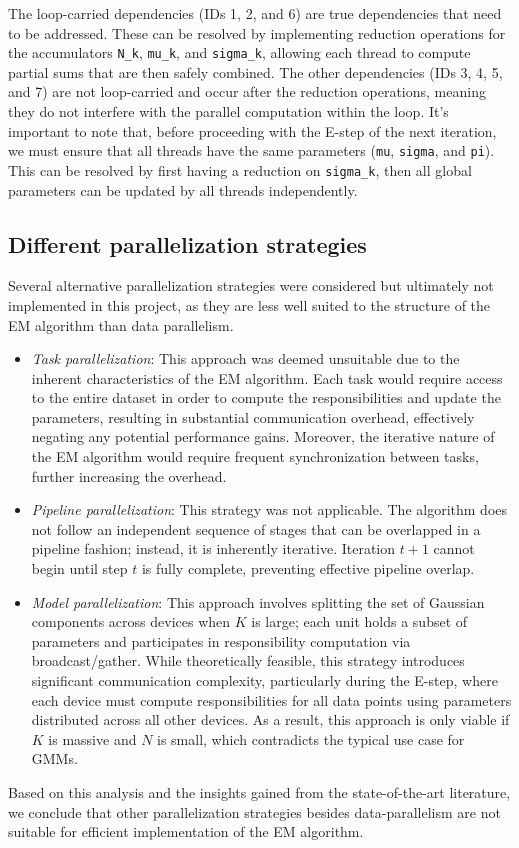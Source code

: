 The loop-carried dependencies (IDs 1, 2, and 6) are true dependencies that need to be addressed.
These can be resolved by implementing reduction operations for the accumulators \texttt{N\_k}, \texttt{mu\_k}, and \texttt{sigma\_k}, allowing each thread to compute partial sums that are then safely combined.
The other dependencies (IDs 3, 4, 5, and 7) are not loop-carried and occur after the reduction operations, meaning they do not interfere with the parallel computation within the loop.
It's important to note that, before proceeding with the E-step of the next iteration, we must ensure that all threads have the same parameters (\texttt{mu}, \texttt{sigma}, and \texttt{pi}).
This can be resolved by first having a reduction on \texttt{sigma\_k}, then all global parameters can be updated by all threads independently. 

\subsection{Different parallelization strategies}
Several alternative parallelization strategies were considered but ultimately not implemented in this project, 
as they are less well suited to the structure of the EM algorithm than data parallelism.
\begin{itemize}
    \item \emph{Task parallelization}: This approach was deemed unsuitable due to the inherent characteristics of the EM algorithm.
    Each task would require access to the entire dataset in order to compute the responsibilities and update the parameters,
    resulting in substantial communication overhead, effectively negating any potential performance gains.
    Moreover, the iterative nature of the EM algorithm would require frequent synchronization between tasks, further increasing the overhead.
    \item \emph{Pipeline parallelization}: This strategy was not applicable.
    The algorithm does not follow an independent sequence of stages that can be overlapped in a pipeline fashion;
    instead, it is inherently iterative. Iteration $t+1$ cannot begin until step $t$ is fully complete,
    preventing effective pipeline overlap.
    \item \emph{Model parallelization}: This approach involves splitting the set of Gaussian components across devices when $K$ is large;
    each unit holds a subset of parameters and participates in responsibility computation via broadcast/gather.
    While theoretically feasible, this strategy introduces significant communication complexity, 
    particularly during the E-step, where each device must compute responsibilities for all data points using parameters distributed across all other devices.
    As a result, this approach is only viable if $K$ is massive and $N$ is small, which contradicts the typical use case for GMMs.
\end{itemize}
Based on this analysis and the insights gained from the state-of-the-art literature, we conclude that other parallelization strategies besides data-parallelism are
not suitable for efficient implementation of the EM algorithm.